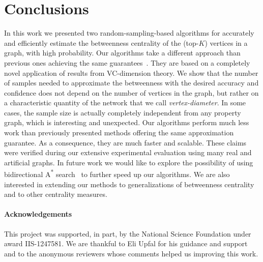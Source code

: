 \section{Conclusions}\label{sec:concl}
In this work we presented two random-sampling-based algorithms for accurately and
efficiently estimate the betweenness centrality of the (top-$K$) vertices in a
graph, with high probability.
Our algorithms take a different approach than previous ones achieving the same
guarantees~\citep{BrandesP07,GeisbergerSS08,JacobKLPT05}. They are based on a
completely novel application of results from VC-dimension theory. We show that
the number of samples needed to approximate the betweenness with the desired
accuracy and confidence does not depend on the number of vertices in the graph,
but rather on a characteristic quantity of the network that we call
\emph{vertex-diameter}. In some cases, the sample size is actually completely
independent from any property graph, which is interesting and unexpected.
Our algorithms perform much less work than previously presented methods offering
the same approximation guarantee. As a consequence, they are much faster and
scalable. These claims were verified during our extensive experimental
evaluation using many real and artificial graphs. In future work we would like
to explore the possibility of using bidirectional A\textsuperscript{*}
search~\citep{Pohl69,KaindlK97} to further speed up our algorithms.  We are also
interested in extending our methods to generalizations of betweenness
centrality~\citep{KourtellisASIT12,DolevEP10} and to other centrality measures. 

\paragraph*{Acknowledgements} This project was supported, in part, by the
National Science Foundation under award IIS-1247581. We are thankful to Eli
Upfal for his guidance and support and to the anonymous reviewers whose comments
helped us improving this work.

